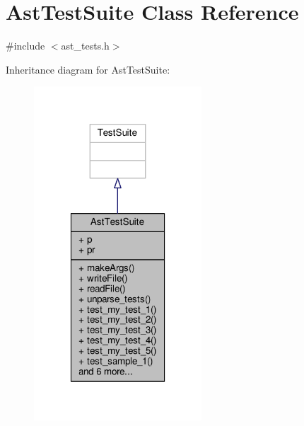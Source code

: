 \hypertarget{classAstTestSuite}{\section{Ast\-Test\-Suite Class Reference}
\label{classAstTestSuite}
}


{\ttfamily \#include $<$ast\-\_\-tests.\-h$>$}



Inheritance diagram for Ast\-Test\-Suite\-:\nopagebreak
\begin{figure}[H]
\begin{center}
\leavevmode
\includegraphics[width=178pt]{classAstTestSuite__inherit__graph}
\end{center}
\end{figure}


